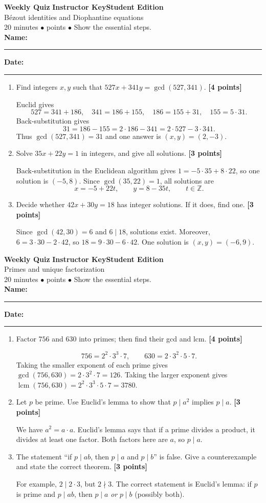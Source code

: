 \documentclass[11pt]{article}
\newcounter{quiznum}
\newcommand{\Z}{\mathbb Z}
\newcommand{\edition}{\ifanswers Instructor Key\else Student Edition\fi}
\newcommand{\points}[1]{\hfill{\small\color{coral}\textbf{[#1 points]}}}
\newcommand{\quizheading}[1]{%
  \clearpage\stepcounter{quiznum}%
  \begin{tcolorbox}[
    enhanced,colback=paper,colframe=navy,boxrule=1.1pt,arc=2mm,
    left=4mm,right=4mm,top=2.5mm,bottom=2.5mm,
    borderline west={4pt}{0pt}{teal}]
    {\Large\bfseries\color{navy}Weekly Quiz \thequiznum}\hfill
    {\bfseries\color{teal}\edition}\\[-1pt]
    {\large\color{ink}#1}\\[2pt]
    {\small\color{muted}20 minutes \quad $\bullet$ \quad 10 points \quad $\bullet$ \quad Show the essential steps.}
    \ifanswers\else
      \\[5pt]\textbf{Name:}\ \rule{0.48\linewidth}{0.4pt}\hfill
      \textbf{Date:}\ \rule{0.20\linewidth}{0.4pt}
    \fi
  \end{tcolorbox}
}
\begin{document}
\quizheading{B\'ezout identities and Diophantine equations}
\begin{enumerate}
  \item Find integers $x,y$ such that $527x+341y=\gcd(527,341)$. \points{4}
  \begin{solution}[1.45in]
    Euclid gives
    \[
      527=341+186,\quad 341=186+155,\quad 186=155+31,\quad 155=5\cdot31.
    \]
    Back-substitution gives
    \[
      31=186-155=2\cdot186-341=2\cdot527-3\cdot341.
    \]
    Thus $\gcd(527,341)=31$ and one answer is $(x,y)=(2,-3)$.
  \end{solution}

  \item Solve $35x+22y=1$ in integers, and give all solutions. \points{3}
  \begin{solution}[1.3in]
    Back-substitution in the Euclidean algorithm gives
    $1=-5\cdot35+8\cdot22$, so one solution is $(-5,8)$. Since
    $\gcd(35,22)=1$, all solutions are
    \[
       x=-5+22t,\qquad y=8-35t,\qquad t\in\Z.
    \]
  \end{solution}

  \item Decide whether $42x+30y=18$ has integer solutions. If it does, find one.
  \points{3}
  \begin{solution}[1.25in]
    Since $\gcd(42,30)=6$ and $6\mid18$, solutions exist. Moreover,
    $6=3\cdot30-2\cdot42$, so
    $18=9\cdot30-6\cdot42$. One solution is $(x,y)=(-6,9)$.
  \end{solution}
\end{enumerate}

\quizheading{Primes and unique factorization}
\begin{enumerate}
  \item Factor $756$ and $630$ into primes; then find their gcd and lcm. \points{4}
  \begin{solution}[1.35in]
    \[
    756=2^2\cdot3^3\cdot7,\qquad 630=2\cdot3^2\cdot5\cdot7.
    \]
    Taking the smaller exponent of each prime gives
    $\gcd(756,630)=2\cdot3^2\cdot7=126$. Taking the larger exponent gives
    $\operatorname{lcm}(756,630)=2^2\cdot3^3\cdot5\cdot7=3780$.
  \end{solution}

  \item Let $p$ be prime. Use Euclid's lemma to show that $p\mid a^2$ implies
  $p\mid a$. \points{3}
  \begin{solution}[1.2in]
    We have $a^2=a\cdot a$. Euclid's lemma says that if a prime divides a product,
    it divides at least one factor. Both factors here are $a$, so $p\mid a$.
  \end{solution}

  \item The statement ``if $p\mid ab$, then $p\mid a$ and $p\mid b$'' is false.
  Give a counterexample and state the correct theorem. \points{3}
  \begin{solution}[1.25in]
    For example, $2\mid 2\cdot3$, but $2\nmid3$. The correct statement is
    Euclid's lemma: if $p$ is prime and $p\mid ab$, then $p\mid a$ \emph{or}
    $p\mid b$ (possibly both).
  \end{solution}
\end{enumerate}
\end{document}
